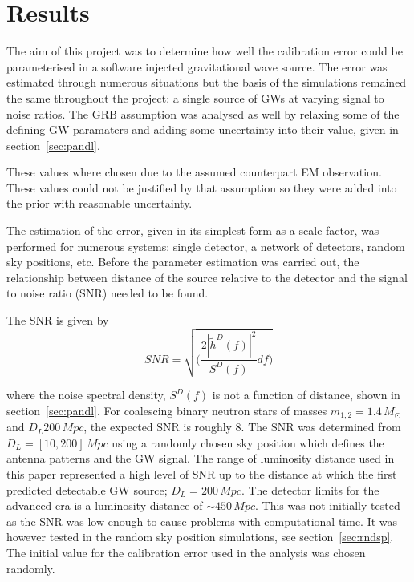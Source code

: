\documentclass{jpconf}
\newcommand{\gws}{\tilde{h}}
\begin{document}




\section{Results\label{sec:results}}

The aim of this project was to determine how well the calibration error could be parameterised in a software injected gravitational wave source. The error was estimated through numerous situations but the basis of the simulations remained the same throughout the project: a single source of GWs at varying signal to noise ratios. The GRB assumption was analysed as well by relaxing some of the defining GW paramaters and adding some uncertainty into their value, given in section~\ref{sec:pandl}. 


These values where chosen due to the assumed counterpart EM observation. These values could not be justified by that assumption so they were added into the prior with reasonable uncertainty.

The estimation of the error, given in its simplest form as a scale factor, was performed for numerous systems: single detector, a network of detectors, random sky positions, etc. Before the parameter estimation was carried out, the relationship between distance of the source relative to the detector and the signal to noise ratio (SNR) needed to be found.  

The SNR is given by
\begin{equation}
  \label{eq:snr}
  SNR = \sqrt{\Bigg( \frac{2 |\gws^D(f)|^2}{S^D(f)} df \Bigg)}
\end{equation}

where the noise spectral density, $S^D(f)$ is not a function of distance, shown in section~\ref{sec:pandl}. For coalescing binary neutron stars of masses $m_{1,2} = 1.4\,M_{\odot}$ and  $D_{L}200\,Mpc$, the expected SNR is roughly 8. The SNR was determined from $D_{L} = [10,200]\,Mpc$  using a randomly chosen sky position which defines the antenna patterns and the GW signal. The range of luminosity distance used in this paper represented a high level of SNR up to the distance at which the first predicted detectable GW source; $D_{L} = 200\,Mpc$. The detector limits for the advanced era is a luminosity distance of $\sim 450\,Mpc$. This was not initially tested as the SNR was low enough to cause problems with computational time. It was however tested in the random sky position simulations, see section~\ref{sec:rndsp}. The initial value for the calibration error used in the analysis was chosen randomly.
\end{document}
